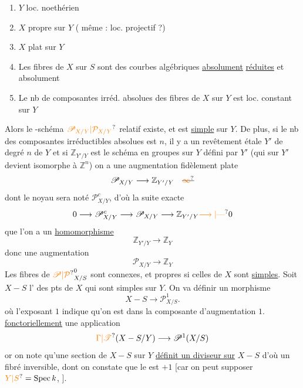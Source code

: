 \begin{enumerate}[label=\alph*)]
\item $Y$ loc. noethérien
\item $X$ propre sur $Y$ ({} même : loc. projectif ?)
\item $X$ plat sur $Y$
\item Les fibres de $X$ sur $S$ sont des courbes algébriques \uline{absolument}   \uline{réduites} et absolument  
\item Le nb de composantes  irréd. absolues des fibres de $X$ sur $Y$ est loc. constant sur $Y$
\end{enumerate}
Alors le {}-schéma ${\unsure{\mathscr P_{X/Y}|\mathcal P_{X/Y}}}$ relatif existe, et est \uline{simple} sur $Y$.
De plus, si le nb des composantes irréductibles absolues est $n$, il y a un revêtement  étale $Y'$ de degré $n$ de $Y$ et si $\mathbb Z_{Y'/Y}$ est le schéma en groupes  sur $Y$ défini par $Y'$ (qui sur $Y'$ devient isomorphe à $\mathbb Z^n$) on a une augmentation  fidèlement plate
\[
\mathscr P_{X/Y}\longrightarrow\mathbb Z_{Y'/Y}\quad\deleted{{\unsure{\infty}}}
\]
dont le noyau sera noté $\mathscr P_{X/Y}^c$, d'où la suite exacte
\[
0\longrightarrow\mathscr P_{X/Y}^c\longrightarrow\mathscr P_{X/Y}\longrightarrow\mathbb Z_{Y'/Y}{\unsure{\longrightarrow|\text{---}}}0
\]
{} que l'on a un \uline{homomorphisme {}}
\[
\mathbb Z_{Y'/Y}\longrightarrow\mathbb Z_Y
\]
donc une augmentation
\[
\mathscr P_{X/Y}\longrightarrow\mathbb Z_Y
\]
Les fibres de ${\unsure{\mathscr P|\mathcal P}}^0_{X/S}$ sont connexes, et propres si celles de $X$ sont \uline{simples}. Soit  $X-S$ l’{} des pts de $X$ qui sont {} simples sur $Y$. On va définir un morphisme
\[
\boxed{X-S\longrightarrow\mathscr P^1_{X/S}}.
\]
où l’exposant $1$ indique qu’on est dans la composante d’augmentation $1$. {} {} \uline{fonctoriellement}  une application
\[
{\unsure{\Gamma|\mathscr T}}(X-S/Y)\longrightarrow\mathscr P^1(X/S)
\]
or on note qu’une section de $X-S$ sur $Y$ \uline{définit un diviseur sur} $X-S$ {} d’où un fibré inversible, dont on constate que le   est $+1$ [car on peut supposer ${\unsure{Y|S}}=\operatorname{Spec}k$, {}].

